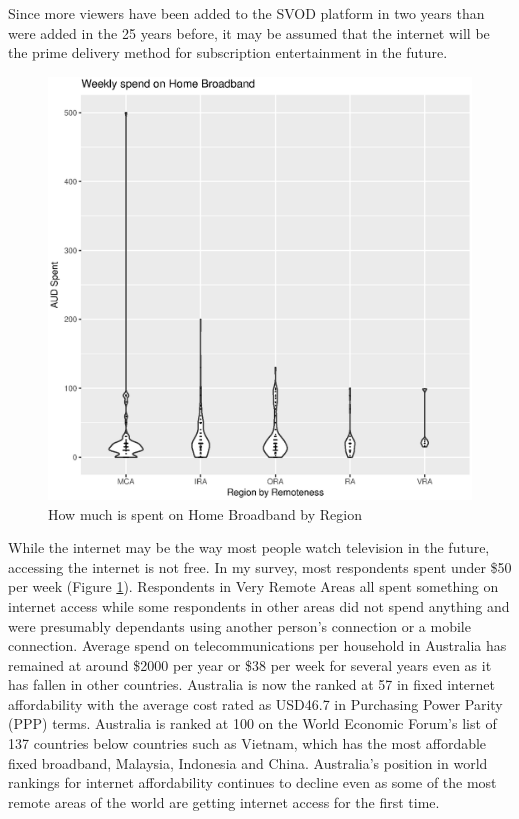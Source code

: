 Since more viewers have been added to the SVOD platform in two years than were added in the 25 years before, it may be assumed that the internet will be the prime delivery method for subscription entertainment in the future\cite{RefWorks:407}.
\begin{figure}
\centering
\includegraphics[scale=0.5]{figures/VChart13-WeeklySpendHomeBroadband.eps}
\caption{How much is spent on Home Broadband by Region} \label{fig:VC013HomeBroadbandSpendRegions}
\end{figure}
While the internet may be the way most people watch television in the future, accessing the internet is not free.  In my survey, most respondents spent under \$50 per week (Figure \ref{fig:VC013HomeBroadbandSpendRegions}). Respondents in Very Remote Areas all spent something on internet access while some respondents in other areas did not spend anything and were presumably dependants using another person's connection or a mobile connection. Average spend on telecommunications per household in Australia has remained at around \$2000 per year or \$38 per week for several years even as it has fallen in other countries. Australia is now the ranked at 57 in fixed internet affordability with the average cost rated as USD46.7 in Purchasing Power Parity (PPP) terms. Australia is ranked at 100 on the World Economic Forum's list of 137 countries below countries such as Vietnam, which has the most affordable fixed broadband, Malaysia, Indonesia and China\cite[p27,229]{RefWorks:412}. Australia's position in world rankings for internet affordability continues to decline even as some of the most remote areas of the world are getting internet access for the first time. 

